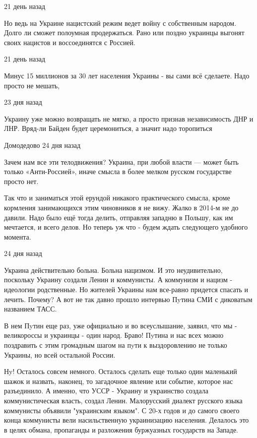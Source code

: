 \begin{itemize}
 21 день назад

Но ведь на Украине нацистский режим ведет войну с собственным народом. Долго ли
сможет полоумная продержаться. Рано или поздно украинцы выгонят своих нацистов
и воссоединятся с Россией.

 21 день назад

Минус 15 миллионов за 30 лет населения Украины - вы сами всё сделаете. Надо просто не мешать,

 23 дня назад  

Украину уже можно возвращать не мягко, а просто признав независимость ДНР и
ЛНР. Вряд-ли Байден будет церемониться, а значит надо торопиться

 Домодедово 24 дня назад  

Зачем нам все эти телодвижения? Украина, при любой власти — может быть только
«Анти-Россией», иначе смысла в более мелком русском государстве просто нет.

Так что и заниматься этой ерундой никакого практического смысла, кроме
кормления занимающихся этим чиновников я не вижу.  Жалко в 2014-м не до давили.
Надо было ещё тогда делить, отправляя западню в Польшу, как им мечтается, и
всего делов.  Но теперь уж что - будем ждать следующего удобного момента.

 24 дня назад  

Украина действительно больна. Больна нацизмом. И это неудивительно, поскольку
Украину создали Ленин и коммунисты. А коммунизм и нацизм - идеологии
родственные. Но жителей Украины нам все-равно придется спасать и лечить.
Почему? А вот не так давно прошло интервью Пyтина СМИ с диковатым названием
ТАСС.

В нем Пyтин еще раз, уже официально и во всеуслышание, заявил, что мы -
великороссы и украинцы - один народ. Браво! Пyтина и нас всех можно поздравить
с этим громадным шагом на пyти к выздоровлению не только Украины, но всей
остальной России.

Нy! Осталось совсем немного. Осталось сделать еще только один маленький шажок и
назвать, наконец, то загадочное явление или событие, которое нас разъединило. А
именно, что УССР - Украину и украинство создала коммунистическая власть, создал
Ленин. Малорусский диалект русского языка коммунисты объявили "украинским
языком". С 20-х годов и до самого своего конца коммунисты вели насильственную
украинизацию населения. Делалось это в целях обмана, пропаганды и разложения
буржуазных государств на Западе.


\end{itemize}
